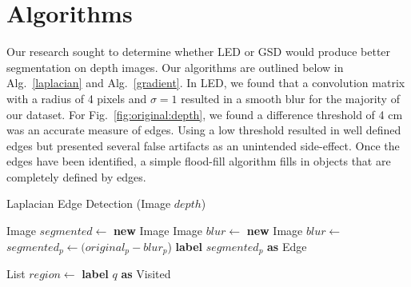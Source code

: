 
\section{Algorithms}
\label{sec:expts}

Our research sought to determine whether LED or GSD would produce better segmentation on depth images. Our algorithms are outlined below in Alg.~\ref{laplacian} and Alg.~\ref{gradient}. In LED, we found that a convolution matrix with a radius of 4 pixels and $\sigma = 1$ resulted in a smooth blur for the majority of our dataset. For Fig.~\ref{fig:original:depth}, we found a difference threshold of 4 cm was an accurate measure of edges. Using a low threshold resulted in well defined edges but presented several false artifacts as an unintended side-effect. Once the edges have been identified, a simple flood-fill algorithm fills in objects that are completely defined by edges.  

\begin{algorithm}
\caption{Laplacian Edge Detection (Image $depth$)}\label{laplacian}
\begin{algorithmic}[1]
\State Image $segmented \gets$ \textbf{new} Image
\State Image  $blur \gets$ \textbf{new} Image
\State $blur \gets $ 
\State $segmented_{p} \gets (original_{p}-blur_{p}$)
\State \textbf{label} $segmented_{p}$ \textbf{as} Edge
\EndIf
\EndFor
\item[]
\State List $region \gets$  
\State \textbf{label} $q$ \textbf{as} Visited
\EndFor
\EndIf
\EndFor
\State {}
\end{algorithmic}
\end{algorithm}

